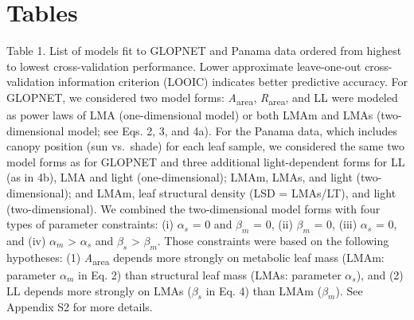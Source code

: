 \documentclass[
  12pt,
  letterpaper,
  DIV=11,
  numbers=noendperiod]{scrartcl}
\begin{document}
\newpage

\section{Tables}\label{tables}

Table 1. List of models fit to GLOPNET and Panama data ordered from
highest to lowest cross-validation performance. Lower approximate
leave-one-out cross-validation information criterion (LOOIC) indicates
better predictive accuracy. For GLOPNET, we considered two model forms:
\emph{A}\textsubscript{area}, \emph{R}\textsubscript{area}, and LL were
modeled as power laws of LMA (one-dimensional model) or both LMAm and
LMAs (two-dimensional model; see Eqs. 2, 3, and 4a). For the Panama
data, which includes canopy position (sun vs.~shade) for each leaf
sample, we considered the same two model forms as for GLOPNET and three
additional light-dependent forms for LL (as in 4b), LMA and light
(one-dimensional); LMAm, LMAs, and light (two-dimensional); and LMAm,
leaf structural density (LSD = LMAs/LT), and light (two-dimensional). We
combined the two-dimensional model forms with four types of parameter
constraints: (i) \(\alpha_s\) = 0 and \(\beta_m\) = 0, (ii) \(\beta_m\)
= 0, (iii) \(\alpha_s\) = 0, and (iv) \(\alpha_m\) \textgreater{}
\(\alpha_s\) and \(\beta_s\) \textgreater{} \(\beta_m\). Those
constraints were based on the following hypotheses: (1)
\emph{A}\textsubscript{area} depends more strongly on metabolic leaf
mass (LMAm: parameter \(\alpha_m\) in Eq. 2) than structural leaf mass
(LMAs: parameter \(\alpha_s\)), and (2) LL depends more strongly on LMAs
(\(\beta_s\) in Eq. 4) than LMAm (\(\beta_m\)). See Appendix S2 for more
details.
\end{document}
